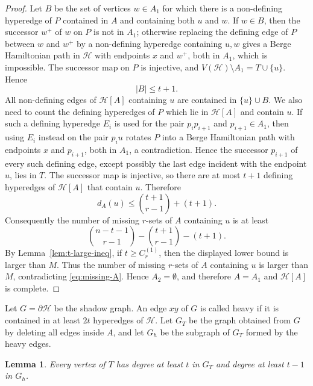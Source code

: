 \documentclass[12pt]{article}
\newtheorem{lemma}[theorem]{Lemma}
\newcommand{\Hcal}{\mathcal H}
\begin{document}
\begin{proof}
Let $B$ be the set of vertices $w\in A_1$ for which there is a
non-defining hyperedge of $P$ contained in $A$ and containing both $u$ and
$w$.  If $w\in B$, then the successor $w^+$ of $w$ on $P$ is not in
$A_1$; otherwise replacing the defining edge of $P$ between $w$ and
$w^+$ by a non-defining hyperedge containing $u,w$ gives a Berge
Hamiltonian path in $\Hcal$ with endpoints $x$ and $w^+$, both in $A_1$,
which is impossible.  The successor map on $P$ is injective, and
$V(\Hcal)\setminus A_1=T\cup\{u\}$.  Hence
$$
        |B|\le t+1.
$$
All non-defining edges of $\Hcal[A]$ containing $u$ are contained in
$\{u\}\cup B$.  We also need to count the defining hyperedges of $P$
which lie in $\Hcal[A]$ and contain $u$.  If such a defining hyperedge
$E_i$ is used for the pair $p_i p_{i+1}$ and $p_{i+1}\in A_1$, then
using $E_i$ instead on the pair $p_i u$ rotates $P$ into a Berge
Hamiltonian path with endpoints $x$ and $p_{i+1}$, both in $A_1$, a
contradiction.  Hence the successor $p_{i+1}$ of every such defining
edge, except possibly the last edge incident with the endpoint $u$, lies
in $T$.  The successor map is injective, so there are at most $t+1$
defining hyperedges of $\Hcal[A]$ that contain $u$.  Therefore
$$
        d_A(u)\le \binom{t+1}{r-1}+(t+1).
$$
Consequently the number of missing $r$-sets of $A$ containing $u$ is at
least
$$
        \binom{n-t-1}{r-1}-\binom{t+1}{r-1}-(t+1).
$$
By Lemma~\ref{lem:t-large-ineq}, if $t\ge C_r^{(1)}$, then
the displayed lower bound is larger than $M$.
Thus the number of missing $r$-sets of $A$ containing $u$ is larger than
$M$, contradicting \eqref{eq:missing-A}.  Hence $A_2=\emptyset$, and
therefore $A=A_1$ and $\Hcal[A]$ is complete.
\end{proof}

Let $G=\partial\Hcal$ be the shadow graph.  An edge $xy$ of $G$ is called
heavy if it is contained in at least $2t$ hyperedges of $\Hcal$.
Let $G_T$ be the graph obtained from $G$ by deleting all edges inside
$A$, and let $G_h$ be the subgraph of $G_T$ formed by the heavy edges.

\begin{lemma}\label{lem:heavy-degree}
Every vertex of $T$ has degree at least $t$ in $G_T$ and degree at least
$t-1$ in $G_h$.
\end{lemma}
\end{document}
